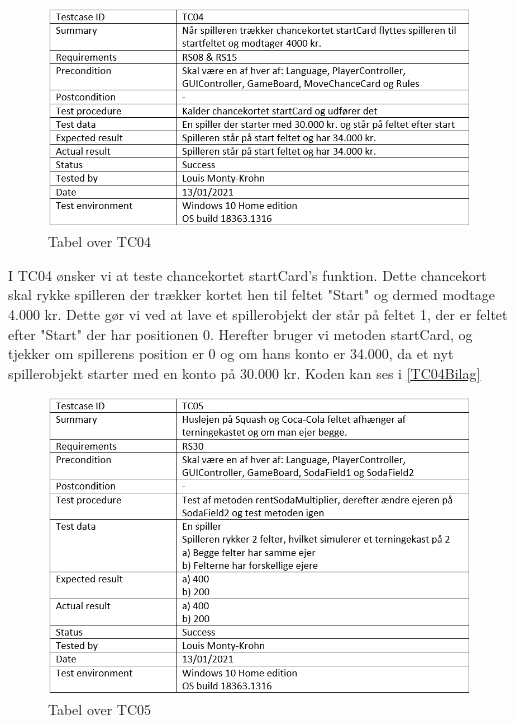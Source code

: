 \begin{flushleft}
\begin{figure}[H] %
    \centering
    \includegraphics[width=14cm]{Report/figures/Unittests/TC04.PNG}
    \caption{Tabel over TC04}
    \label{Testcase04}
\end{figure}

I TC04 ønsker vi at teste chancekortet startCard's funktion. Dette chancekort skal rykke spilleren der trækker kortet hen til feltet "Start" og dermed modtage 4.000 kr. Dette gør vi ved at lave et spillerobjekt der står på feltet 1, der er feltet efter "Start" der har positionen 0. Herefter bruger vi metoden startCard, og tjekker om spillerens position er 0 og om hans konto er 34.000, da et nyt spillerobjekt starter med en konto på 30.000 kr. Koden kan ses i \ref{TC04Bilag}

\begin{figure}[H] %
    \centering
    \includegraphics[width=14cm]{Report/figures/Unittests/TC05.PNG}
    \caption{Tabel over TC05}
    \label{Testcase05}
\end{figure}


\end{flushleft}
